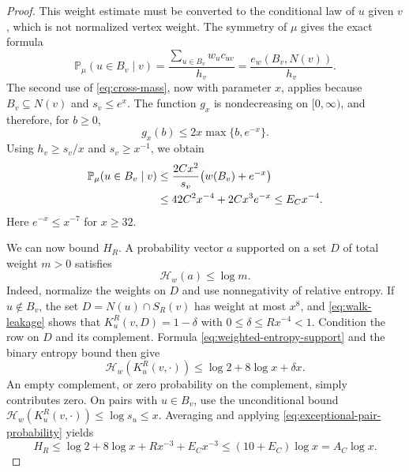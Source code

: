 \documentclass[11pt]{article}
\theoremstyle{definition}
\theoremstyle{remark}
\numberwithin{equation}{section}
\begin{document}
\begin{proof}
This weight estimate must be converted to the conditional law of $u$
given $v$, which is not normalized vertex weight.  The symmetry of $\mu$
gives the exact formula
\[
 \mathbb P_\mu(u\in B_v\mid v)
 =\frac{\sum_{u\in B_v}w_uc_{uv}}{h_v}
 =\frac{e_w(B_v,N(v))}{h_v}.
\]
The second use of \eqref{eq:cross-mass}, now with parameter $x$,
applies because $B_v\subseteq N(v)$ and $s_v\le e^x$.  The function $g_x$
is nondecreasing on $[0,\infty)$, and therefore, for $b\ge0$,
\[
 g_x(b)\le2x\max\{b,e^{-x}\}.
\]
Using $h_v\ge s_v/x$ and $s_v\ge x^{-1}$, we obtain
\begin{align}
 \mathbb P_\mu(u\in B_v\mid v)
 &\le\frac{2Cx^2}{s_v}\bigl(w(B_v)+e^{-x}\bigr)\notag\\
 &\le42C^2x^{-4}+2Cx^3e^{-x}
 \le E_Cx^{-4}.
 \label{eq:exceptional-pair-probability}
\end{align}
Here $e^{-x}\le x^{-7}$ for $x\ge32$.

We can now bound $H_R$.  A probability vector $a$ supported on a set $D$
of total weight $m>0$ satisfies
\begin{equation}
 \mathcal H_w(a)\le\log m.
 \label{eq:weighted-entropy-support}
\end{equation}
Indeed, normalize the weights on $D$ and use nonnegativity of relative
entropy.  If $u\notin B_v$, the set $D=N(u)\cap S_R(v)$ has weight at most
$x^8$, and \eqref{eq:walk-leakage} shows that
$K_u^R(v,D)=1-\delta$ with $0\le\delta\le Rx^{-4}<1$.  Condition the
row on $D$ and its complement.  Formula \eqref{eq:weighted-entropy-support}
and the binary entropy bound then give
\[
 \mathcal H_w(K_u^R(v,\cdot))
 \le\log2+8\log x+\delta x.
\]
An empty complement, or zero probability on the complement, simply
contributes zero.  On pairs with $u\in B_v$, use the unconditional bound
$\mathcal H_w(K_u^R(v,\cdot))\le\log s_u\le x$.  Averaging and applying
\eqref{eq:exceptional-pair-probability} yields
\[
 H_R\le\log2+8\log x+Rx^{-3}+E_Cx^{-3}
 \le(10+E_C)\log x=A_C\log x.
\]


\end{proof}
\end{document}
